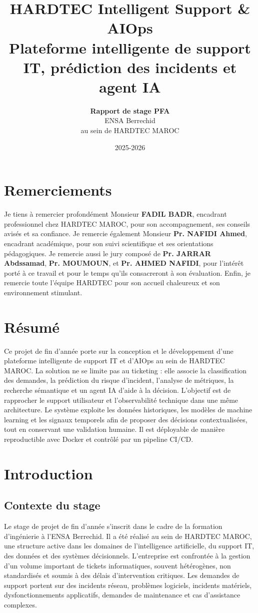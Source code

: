 \documentclass[11pt,a4paper]{report}
\title{\textbf{HARDTEC Intelligent Support \& AIOps}\\[0.5cm]\large Plateforme intelligente de support IT, prédiction des incidents et agent IA}
\author{\textbf{Rapport de stage PFA}\\[0.3cm] ENSA Berrechid\\[0.3cm] au sein de HARDTEC MAROC}
\date{2025-2026}
\begin{document}
\maketitle
\tableofcontents
\listoffigures

\chapter*{Remerciements}
Je tiens à remercier profondément Monsieur \textbf{FADIL BADR}, encadrant professionnel chez HARDTEC MAROC, pour son accompagnement, ses conseils avisés et sa confiance. Je remercie également Monsieur \textbf{Pr. NAFIDI Ahmed}, encadrant académique, pour son suivi scientifique et ses orientations pédagogiques. Je remercie aussi le jury composé de \textbf{Pr. JARRAR Abdssamad}, \textbf{Pr. MOUMOUN}, et \textbf{Pr. AHMED NAFIDI}, pour l’intérêt porté à ce travail et pour le temps qu’ils consacreront à son évaluation. Enfin, je remercie toute l’équipe HARDTEC pour son accueil chaleureux et son environnement stimulant.

\chapter*{Résumé}
Ce projet de fin d’année porte sur la conception et le développement d’une plateforme intelligente de support IT et d’AIOps au sein de HARDTEC MAROC. La solution ne se limite pas au ticketing : elle associe la classification des demandes, la prédiction du risque d’incident, l’analyse de métriques, la recherche sémantique et un agent IA d’aide à la décision. L’objectif est de rapprocher le support utilisateur et l’observabilité technique dans une même architecture. Le système exploite les données historiques, les modèles de machine learning et les signaux temporels afin de proposer des décisions contextualisées, tout en conservant une validation humaine. Il est déployable de manière reproductible avec Docker et contrôlé par un pipeline CI/CD.

\chapter{Introduction}
\section{Contexte du stage}
Le stage de projet de fin d’année s’inscrit dans le cadre de la formation d’ingénierie à l’ENSA Berrechid. Il a été réalisé au sein de HARDTEC MAROC, une structure active dans les domaines de l’intelligence artificielle, du support IT, des données et des systèmes décisionnels. L’entreprise est confrontée à la gestion d’un volume important de tickets informatiques, souvent hétérogènes, non standardisés et soumis à des délais d’intervention critiques. Les demandes de support portent sur des incidents réseau, problèmes logiciels, incidents matériels, dysfonctionnements applicatifs, demandes de maintenance et cas d’assistance complexes.
\end{document}
